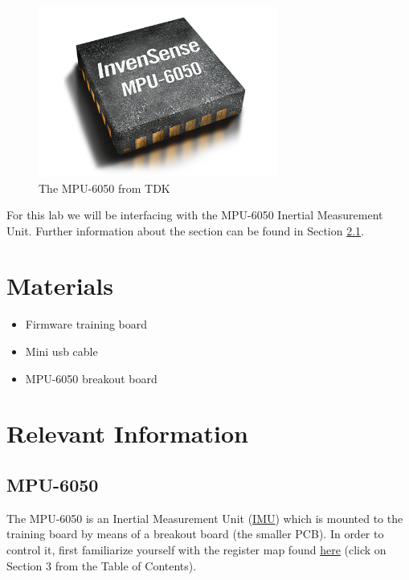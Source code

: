 \documentclass{article}
\begin{document}
        \begin{figure}[ht]
            \centering
            \includegraphics[width = 0.7\textwidth]{img/rp-mpu-6050.png}
            \caption{The MPU-6050 from TDK}
        \end{figure}
        For this lab we will be interfacing with the MPU-6050 Inertial Measurement Unit. Further information about the section can be found in Section \ref{readwrite}. \\
        
        \clearpage
        
\section{Materials}
\begin{itemize}
	\item Firmware training board
	\item Mini usb cable
	\item MPU-6050 breakout board
\end{itemize}

\section{Relevant Information}
    \subsection{MPU-6050} \label{readwrite}
        The MPU-6050 is an Inertial Measurement Unit (\href{https://en.wikipedia.org/wiki/Inertial_measurement_unit}{IMU}) which is mounted to the training board by means of a breakout board (the smaller PCB).  
        In order to control it, first familiarize yourself with the register map found \href{https://cdn.sparkfun.com/datasheets/Sensors/Accelerometers/RM-MPU-6000A.pdf}{here} (click on Section 3 from the Table of Contents).
        
\end{document}
